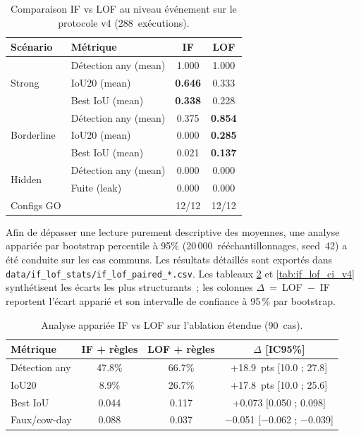 \begin{table}[H]
    \centering
    \caption{Comparaison IF vs LOF au niveau événement sur le protocole v4 (288~exécutions).}
    \label{tab:if_vs_lof_v4}
    \begin{tabular}{llcc}
        \toprule
        \textbf{Scénario} & \textbf{Métrique}
            & \textbf{IF} & \textbf{LOF} \\
        \midrule
        \multirow{3}{*}{Strong}
            & Détection any (mean)      & 1.000 & 1.000 \\
            & IoU20 (mean)              & \textbf{0.646} & 0.333 \\
            & Best IoU (mean)           & \textbf{0.338} & 0.228 \\
        \midrule
        \multirow{3}{*}{Borderline}
            & Détection any (mean)      & 0.375 & \textbf{0.854} \\
            & IoU20 (mean)              & 0.000 & \textbf{0.285} \\
            & Best IoU (mean)           & 0.021 & \textbf{0.137} \\
        \midrule
        \multirow{2}{*}{Hidden}
            & Détection any (mean)      & 0.000 & 0.000 \\
            & Fuite (leak)              & 0.000 & 0.000 \\
        \midrule
        \multirow{1}{*}{Configs GO}
            &                           & 12/12 & 12/12 \\
        \bottomrule
    \end{tabular}
\end{table}

Afin de dépasser une lecture purement descriptive des moyennes, une analyse appariée par
bootstrap percentile à 95\% (20\,000~rééchantillonnages, seed~42) a été conduite sur les
cas communs. Les résultats détaillés sont exportés dans
\texttt{data/if\_lof\_stats/if\_lof\_paired\_*.csv}. Les tableaux
\ref{tab:if_lof_ci_expanded} et \ref{tab:if_lof_ci_v4} synthétisent les écarts les plus
structurants~; les colonnes $\Delta$~=~LOF~$-$~IF reportent l'écart apparié et son
intervalle de confiance à 95\,\% par bootstrap.

\begin{table}[H]
    \centering
    \caption{Analyse appariée IF vs LOF sur l'ablation étendue (90~cas).}
    \label{tab:if_lof_ci_expanded}
    \small
    \begin{tabular}{lccc}
        \toprule
        \textbf{Métrique} & \textbf{IF + règles} & \textbf{LOF + règles}
            & \textbf{$\Delta$ [IC95\%]} \\
        \midrule
        Détection any & 47.8\% & 66.7\% & +18.9~pts [10.0 ; 27.8] \\
        IoU20 & 8.9\% & 26.7\% & +17.8~pts [10.0 ; 25.6] \\
        Best IoU & 0.044 & 0.117 & +0.073 [0.050 ; 0.098] \\
        Faux/cow-day & 0.088 & 0.037 & $-$0.051 [$-$0.062 ; $-$0.039] \\
        \bottomrule
    \end{tabular}
\end{table}

